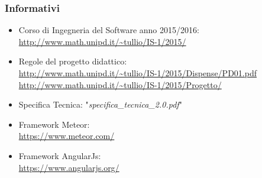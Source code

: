 \documentclass[a4paper,11pt]{article}
\begin{document}
		\subsubsection{Informativi}
		\begin{itemize}
			\item Corso di Ingegneria del Software anno 2015/2016:\\
			\url{http://www.math.unipd.it/~tullio/IS-1/2015/}
			\item Regole del progetto didattico:\\
			\url{http://www.math.unipd.it/~tullio/IS-1/2015/Dispense/PD01.pdf}\\
			\url{http://www.math.unipd.it/~tullio/IS-1/2015/Progetto/}
			\item Specifica Tecnica: "\textit{specifica\_tecnica\_2.0.pdf}"
			\item Framework Meteor:\\
			\url{https://www.meteor.com/}
			\item Framework AngularJs:\\
			\url{https://www.angularjs.org/}
		\end{itemize}
	\pagebreak
	\newpage
	
	\newpage
	
	\newpage
	
	\newpage
	
\end{document}

